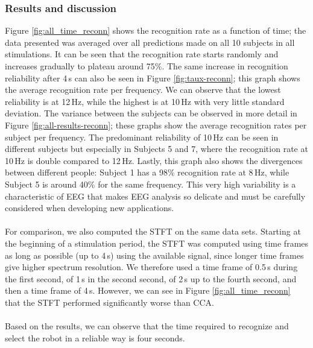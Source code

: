 \documentclass[smallextended]{svjour3}
\begin{document}
\subsubsection{Results and discussion}
Figure \ref{fig:all_time_reconn} shows the recognition rate as a function of time; the data presented was averaged over all predictions made on all 10 subjects in all stimulations.
It can be seen that the recognition rate starts randomly and increases gradually to plateau around 75\%.
The same increase in recognition reliability after 4\,s can also be seen in Figure \ref{fig:taux-reconn}; this graph shows the average recognition rate per frequency.
We can observe that the lowest reliability is at 12\,Hz, while the highest is at 10\,Hz with very little standard deviation.
The variance between the subjects can be observed in more detail in Figure \ref{fig:all-results-reconn}; these graphs show the average recognition rates per subject per frequency.
The predominant reliability of 10\,Hz can be seen in different subjects but especially in Subjects 5 and 7, where the recognition rate at 10\,Hz is double compared to 12\,Hz.
Lastly, this graph also shows the divergences between different people: Subject 1 has a 98\% recognition rate at 8\,Hz, while Subject 5 is around 40\% for the same frequency.
This very high variability is a characteristic of EEG that makes EEG analysis so delicate and must be carefully considered when developing new applications.\\
\\
For comparison, we also computed the STFT on the same data sets.
Starting at the beginning of a stimulation period, the STFT was computed using time frames as long as possible (up to 4\,s) using the available signal, since longer time frames give higher spectrum resolution. %
We therefore used a time frame of 0.5\,s during the first second, of 1\,s in the second second, of 2\,s up to the fourth second, and then a time frame of 4\,s.
However, we can see in Figure \ref{fig:all_time_reconn} that the STFT performed significantly worse than CCA.\\
\\
Based on the results, we can observe that the time required to recognize and select the robot in a reliable way is four seconds. 
\end{document}
